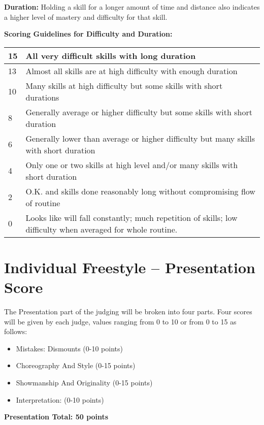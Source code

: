 \textbf{Duration:} Holding a skill for a longer amount of time and distance also indicates a higher level of mastery and difficulty for that skill.

\begin{minipage}{\textwidth}
\textbf{Scoring Guidelines for Difficulty and Duration:} \\

\begin{tabular}{|l|p{12.5cm}|}
\hline
15 & All very difficult skills with long duration \\
\hline
13 & Almost all skills are at high difficulty with enough duration \\
\hline
10 & Many skills at high difficulty but some skills with short durations \\
\hline
8 & Generally average or higher difficulty but some skills with short duration \\
\hline
6 & Generally lower than average or higher difficulty but many skills with short duration \\
\hline
4 & Only one or two skills at high level and/or many skills with short duration \\
\hline
2 & O.K. and skills done reasonably long without compromising flow of routine \\
\hline
0 & Looks like will fall constantly; much repetition of skills; low difficulty when averaged for whole routine. \\
\hline
\end{tabular}
\end{minipage}

\section{Individual Freestyle -- Presentation Score \label{sec:freestyle_individual-presentation-score}}
The Presentation part of the judging will be broken into four parts.
Four scores will be given by each judge, values ranging from 0 to 10 or from 0 to 15 as follows:
\begin{itemize}
\item Mistakes: Dismounts (0-10 points) 
\item Choreography And Style (0-15 points) 
\item Showmanship And Originality (0-15 points) 
\item Interpretation: (0-10 points)
\end{itemize}
\textbf{Presentation Total: 50 points}

